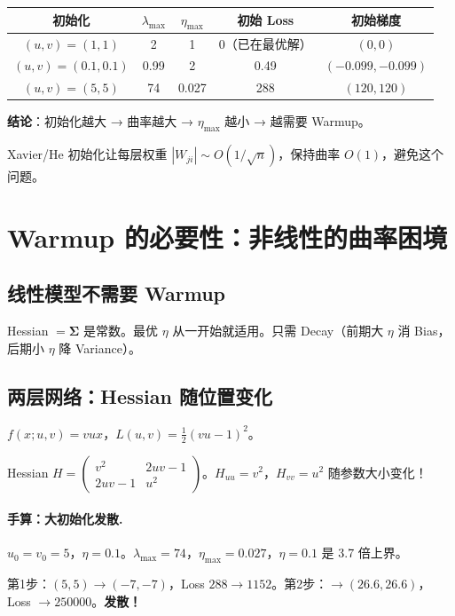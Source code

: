 \documentclass[12pt, a4paper]{ctexart}
\begin{document}
\begin{center}
\begin{tabular}{c|cccc}
初始化 & $\lambda_{\max}$ & $\eta_{\max}$ & 初始 Loss & 初始梯度 \\
\hline
$(u,v)=(1,1)$ & 2 & 1 & 0（已在最优解）& $(0,0)$ \\
$(u,v)=(0.1,0.1)$ & 0.99 & 2 & 0.49 & $(-0.099,-0.099)$ \\
$(u,v)=(5,5)$ & 74 & 0.027 & 288 & $(120,120)$ \\
\end{tabular}
\end{center}

\textbf{结论}：初始化越大 → 曲率越大 → $\eta_{\max}$ 越小 → 越需要 Warmup。

Xavier/He 初始化让每层权重 $|W_{ji}| \sim O(1/\sqrt{n})$，保持曲率 $O(1)$，避免这个问题。


\section{Warmup 的必要性：非线性的曲率困境}

\subsection{线性模型不需要 Warmup}

Hessian $= \boldsymbol{\Sigma}$ 是常数。最优 $\eta$ 从一开始就适用。只需 Decay（前期大 $\eta$ 消 Bias，后期小 $\eta$ 降 Variance）。

\subsection{两层网络：Hessian 随位置变化}

$f(x;u,v) = vux$，$L(u,v) = \frac{1}{2}(vu-1)^2$。

Hessian $H = \begin{pmatrix} v^2 & 2uv-1 \\ 2uv-1 & u^2 \end{pmatrix}$。$H_{uu}=v^2$，$H_{vv}=u^2$ 随参数大小变化！

\paragraph{手算：大初始化发散.} $u_0=v_0=5$，$\eta=0.1$。$\lambda_{\max}=74$，$\eta_{\max}=0.027$，$\eta=0.1$ 是 3.7 倍上界。

第1步：$(5,5)\to(-7,-7)$，Loss $288\to 1152$。第2步：$\to(26.6,26.6)$，Loss $\to 250000$。\textbf{发散！}
\end{document}
